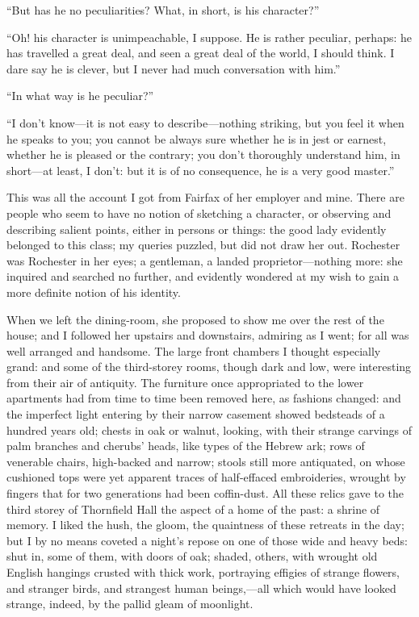 \enquote{But has he no peculiarities? What, in short, is his
	character?}

\enquote{Oh! his character is unimpeachable, I suppose. He is rather
	peculiar, perhaps: he has travelled a great deal, and seen a great deal
	of the world, I should think. I dare say he is clever, but I never had
	much conversation with him.}

\enquote{In what way is he peculiar?}

\enquote{I don't know---it is not easy to describe---nothing striking,
	but you feel it when he speaks to you; you cannot be always sure whether
	he is in jest or earnest, whether he is pleased or the contrary; you
	don't thoroughly understand him, in short---at least, I don't: but it is
	of no consequence, he is a very good master.}

This was all the account I got from \Mrs{} Fairfax of her employer and
mine. There are people who seem to have no notion of sketching a
character, or observing and describing salient points, either in persons
or things: the good lady evidently belonged to this class; my queries
puzzled, but did not draw her out. \Mr{} Rochester was \Mr{} Rochester in
her eyes; a gentleman, a landed proprietor---nothing more: she inquired
and searched no further, and evidently wondered at my wish to gain a
more definite notion of his identity.

When we left the dining-room, she proposed to show me over the rest of
the house; and I followed her upstairs and downstairs, admiring as I
went; for all was well arranged and handsome. The large front chambers
I thought especially grand: and some of the third-storey rooms, though
dark and low, were interesting from their air of antiquity. The
furniture once appropriated to the lower apartments had from time to
time been removed here, as fashions changed: and the imperfect light
entering by their narrow casement showed bedsteads of a hundred years
old; chests in oak or walnut, looking, with their strange carvings of
palm branches and cherubs' heads, like types of the Hebrew ark; rows of
venerable chairs, high-backed and narrow; stools still more antiquated,
on whose cushioned tops were yet apparent traces of half-effaced
embroideries, wrought by fingers that for two generations had been
coffin-dust. All these relics gave to the third storey of Thornfield
Hall the aspect of a home of the past: a shrine of memory. I liked the
hush, the gloom, the quaintness of these retreats in the day; but I by
no means coveted a night's repose on one of those wide and heavy beds:
shut in, some of them, with doors of oak; shaded, others, with wrought
old English hangings crusted with thick work, portraying effigies of
strange flowers, and stranger birds, and strangest human beings,---all
which would have looked strange, indeed, by the pallid gleam of
moonlight.


